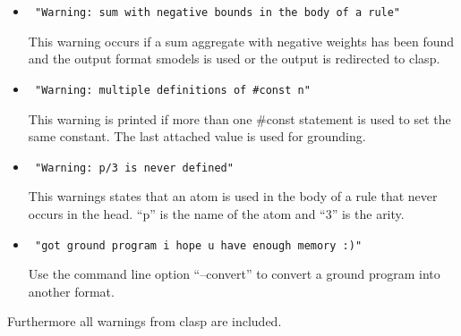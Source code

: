 \documentclass[a4paper,10pt]{article}
\begin{document}
\begin{itemize}
 \item 
\begin{verbatim}
 "Warning: sum with negative bounds in the body of a rule"
\end{verbatim}
This warning occurs if a sum aggregate with negative weights has been found and the output format smodels is used or the output is redirected to clasp.
 \item 
\begin{verbatim}
 "Warning: multiple definitions of #const n"
\end{verbatim}
This warning is printed if more than one \#const statement is used to set the same constant.
The last attached value is used for grounding.
\item
\begin{verbatim}
 "Warning: p/3 is never defined"
\end{verbatim}
This warnings states that an atom is used in the body of a rule that never occurs in the head.
``p'' is the name of the atom and ``3'' is the arity.
\item
\begin{verbatim}
 "got ground program i hope u have enough memory :)"
\end{verbatim}
Use the command line option ``--convert'' to convert a ground program into another format.

\end{itemize}
Furthermore all warnings from clasp are included.
\end{document}
